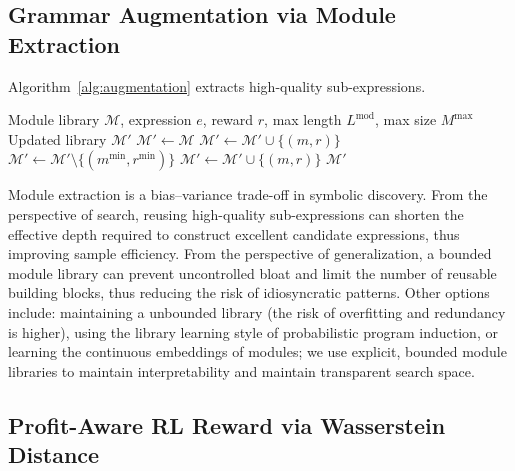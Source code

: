 \subsection{Grammar Augmentation via Module Extraction}
\label{subsec:augmentation}

Algorithm~\ref{alg:augmentation} extracts high-quality sub-expressions.

\begin{algorithm}[htbp]
\caption{Grammar Augmentation}
\label{alg:augmentation}
\begin{algorithmic}[1]
\Require Module library $\mathcal{M}$, expression $e$, reward $r$, max length $L^{\text{mod}}$, max size $M^{\max}$
\Ensure Updated library $\mathcal{M}'$
\State $\mathcal{M}' \leftarrow \mathcal{M}$
            \State $\mathcal{M}' \leftarrow \mathcal{M}' \cup \{(m, r)\}$
            \State $\mathcal{M}' \leftarrow \mathcal{M}' \setminus \{(m^{\min}, r^{\min})\}$
            \State $\mathcal{M}' \leftarrow \mathcal{M}' \cup \{(m, r)\}$
        \EndIf
    \EndIf
\EndFor
\State \Return $\mathcal{M}'$
\end{algorithmic}
\end{algorithm}

Module extraction is a bias--variance trade-off in symbolic discovery. From the perspective of search, reusing high-quality sub-expressions can shorten the effective depth required to construct excellent candidate expressions, thus improving sample efficiency. From the perspective of generalization, a bounded module library can prevent uncontrolled bloat and limit the number of reusable building blocks, thus reducing the risk of idiosyncratic patterns. Other options include: maintaining a unbounded library (the risk of overfitting and redundancy is higher), using the library learning style of probabilistic program induction, or learning the continuous embeddings of modules; we use explicit, bounded module libraries to maintain interpretability and maintain transparent search space.

\subsection{Profit-Aware RL Reward via Wasserstein Distance}
\label{subsec:rlreward}

